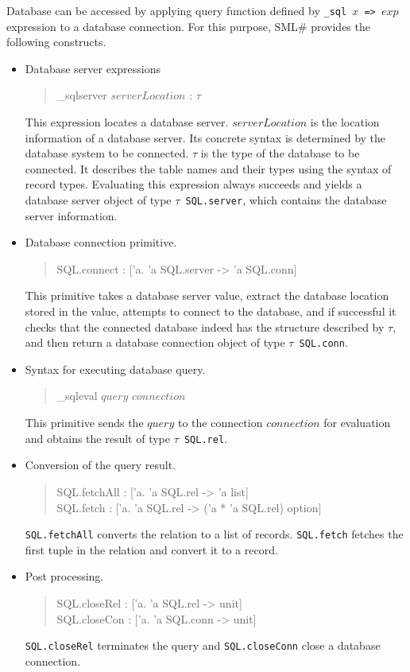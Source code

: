 \documentclass{jbook}
\newcommand{\smlsharp}{SML\#}
\newenvironment{program}{\begin{tt}\begin{quote}}{\end{quote}\end{tt}}
\begin{document}
\else%
	Database can be accessed by applying query function defined by
{\tt \_sql $x$ => $exp$} expression to a database connection.
	For this purpose, \smlsharp{} provides the following constructs.
\begin{itemize}
\item Database server expressions
\begin{program}
\_sqlserver $serverLocation$ : $\tau$
\end{program}
	This expression locates a database server.
	$serverLocation$ is the location information of a database
server.
	Its concrete syntax is determined by the database system to be
connected.
	$\tau$ is the type of the database to be connected.
	It describes the table names and their types using the syntax
of record types.
	Evaluating this expression always succeeds and  yields a
database server object of type {\tt $\tau$ SQL.server}, which contains
the database server information.
\item Database connection primitive.
\begin{program}
SQL.connect : ['a. 'a SQL.server -> 'a SQL.conn]
\end{program}
	This primitive takes a database server value, extract the
database location stored in the value, attempts to connect to the
database, and if successful it checks that the connected database
indeed has the structure described by $\tau$, and then return 
a database connection object of type {\tt $\tau$ SQL.conn}.
	
\item Syntax for executing database query.
\begin{program}
\_sqleval $query$ $connection$
\end{program}
	This primitive sends the $query$ to the connection $connection$
for evaluation and obtains the result of type {\tt $\tau$ SQL.rel}.

\item Conversion of the query result.
\begin{program}
SQL.fetchAll : ['a. 'a SQL.rel -> 'a list]\\
SQL.fetch : ['a. 'a SQL.rel -> ('a * 'a SQL.rel) option]
\end{program}
	{\tt SQL.fetchAll} converts the relation to a list of records.
	{\tt SQL.fetch} fetches the first tuple in the relation and
convert it to a record.
\item Post processing.
\begin{program}
SQL.closeRel : ['a. 'a SQL.rel -> unit]\\
SQL.closeCon : ['a. 'a SQL.conn -> unit]
\end{program}
	{\tt SQL.closeRel} terminates the query and {\tt SQL.closeConn}
close a database connection.
\end{itemize}
\fi%
		
\end{document}
